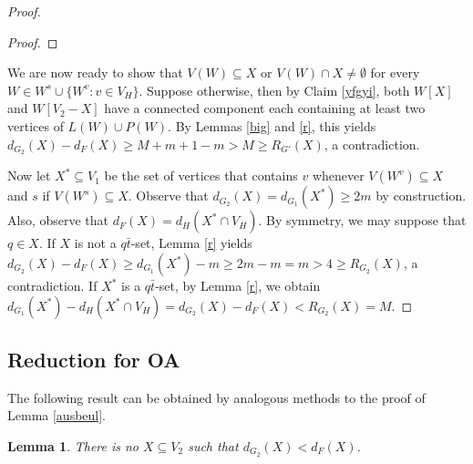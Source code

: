 \documentclass[a4paper,12pt,makeidx]{article}
\newtheorem{lemma}{Lemma}
\begin{document}
\begin{proof}
\begin{proof}
\end{proof}

We are now ready to show that $V(W) \subseteq X$ or $V(W) \cap X \neq \emptyset$ for every $W\in W^s\cup\{W^v:v \in V_H\}$. Suppose otherwise, then by Claim \ref{yfgyi}, both $W[X]$ and $W[V_2-X]$ have a connected component each containing at least two vertices of $L(W)\cup P(W)$. By Lemmas \ref{big} and \ref{r}, this yields $d_{G_2}(X)-d_F(X)\geq M+m+1-m> M \geq R_{G'}(X)$, a contradiction.

Now let $X^*\subseteq V_1$ be the set of vertices that contains $v$ whenever $V(W^v) \subseteq X$ and $s$ if $V(W^s) \subseteq X$. Observe that $d_{G_2}(X)= d_{G_1}(X^*)\geq 2m$ by construction. Also, observe that $d_F(X)=d_H(X^*\cap V_H)$. By symmetry, we may suppose that $q \in X$. If $X$ is not a $q\bar{t}$-set, Lemma \ref{r} yields $d_{G_2}(X)-d_F(X)\geq d_{G_1}(X^*)-m\geq 2m-m=m>4 \geq R_{G_2}(X)$, a contradiction. If $X^*$ is a $q\bar{t}$-set, by Lemma \ref{r}, we obtain $d_{G_1}(X^*)-d_H(X^*\cap V_H)=d_{G_2}(X)-d_F(X)<R_{G_2}(X)=M$. 
\end{proof}
 \subsection{Reduction for OA}

The following result can be obtained by analogous methods to the proof of Lemma \ref{ausbeul}.%

\begin{lemma}\label{notbig}
There is no $X \subseteq V_2$ such that $d_{G_2}(X)<d_F(X)$.
\end{lemma} 
\end{document}
